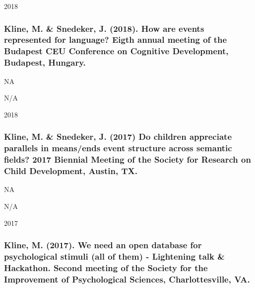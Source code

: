 \documentclass[
]{article}
\begin{document}
2018

\hypertarget{kline-m.-snedeker-j.-2018.-how-are-events-represented-for-language-eigth-annual-meeting-of-the-budapest-ceu-conference-on-cognitive-development-budapest-hungary.}{%
\subsubsection{Kline, M. \& Snedeker, J. (2018). How are events
represented for language? Eigth annual meeting of the Budapest CEU
Conference on Cognitive Development, Budapest,
Hungary.}\label{kline-m.-snedeker-j.-2018.-how-are-events-represented-for-language-eigth-annual-meeting-of-the-budapest-ceu-conference-on-cognitive-development-budapest-hungary.}}

NA

N/A

2018

\hypertarget{kline-m.-snedeker-j.-2017-do-children-appreciate-parallels-in-meansends-event-structure-across-semantic-fields-2017-biennial-meeting-of-the-society-for-research-on-child-development-austin-tx.}{%
\subsubsection{Kline, M. \& Snedeker, J. (2017) Do children appreciate
parallels in means/ends event structure across semantic fields? 2017
Biennial Meeting of the Society for Research on Child Development,
Austin,
TX.}\label{kline-m.-snedeker-j.-2017-do-children-appreciate-parallels-in-meansends-event-structure-across-semantic-fields-2017-biennial-meeting-of-the-society-for-research-on-child-development-austin-tx.}}

NA

N/A

2017

\hypertarget{kline-m.-2017.-we-need-an-open-database-for-psychological-stimuli-all-of-them---lightening-talk-hackathon.-second-meeting-of-the-society-for-the-improvement-of-psychological-sciences-charlottesville-va.}{%
\subsubsection{Kline, M. (2017). We need an open database for
psychological stimuli (all of them) - Lightening talk \& Hackathon.
Second meeting of the Society for the Improvement of Psychological
Sciences, Charlottesville,
VA.}\label{kline-m.-2017.-we-need-an-open-database-for-psychological-stimuli-all-of-them---lightening-talk-hackathon.-second-meeting-of-the-society-for-the-improvement-of-psychological-sciences-charlottesville-va.}}
\end{document}

